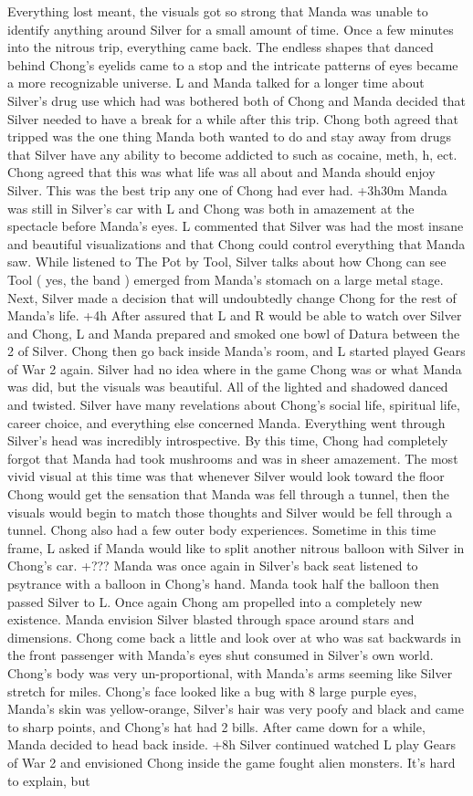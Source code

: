 \documentclass[12pt]{book}
\begin{document}
Everything lost meant, the visuals got so strong that Manda was unable to identify anything around Silver for a small amount of time. Once a few minutes into the nitrous trip, everything came back. The endless shapes that danced behind Chong's eyelids came to a stop and the intricate patterns of eyes became a more recognizable universe. L and Manda talked for a longer time about Silver's drug use which had was bothered both of Chong and Manda decided that Silver needed to have a break for a while after this trip. Chong both agreed that tripped was the one thing Manda both wanted to do and stay away from drugs that Silver have any ability to become addicted to such as cocaine, meth, h, ect. Chong agreed that this was what life was all about and Manda should enjoy Silver. This was the best trip any one of Chong had ever had. +3h30m Manda was still in Silver's car with L and Chong was both in amazement at the spectacle before Manda's eyes. L commented that Silver was had the most insane and beautiful visualizations and that Chong could control everything that Manda saw. While listened to The Pot by Tool, Silver talks about how Chong can see Tool ( yes, the band ) emerged from Manda's stomach on a large metal stage. Next, Silver made a decision that will undoubtedly change Chong for the rest of Manda's life. +4h After assured that L and R would be able to watch over Silver and Chong, L and Manda prepared and smoked one bowl of Datura between the 2 of Silver. Chong then go back inside Manda's room, and L started played Gears of War 2 again. Silver had no idea where in the game Chong was or what Manda was did, but the visuals was beautiful. All of the lighted and shadowed danced and twisted. Silver have many revelations about Chong's social life, spiritual life, career choice, and everything else concerned Manda. Everything went through Silver's head was incredibly introspective. By this time, Chong had completely forgot that Manda had took mushrooms and was in sheer amazement. The most vivid visual at this time was that whenever Silver would look toward the floor Chong would get the sensation that Manda was fell through a tunnel, then the visuals would begin to match those thoughts and Silver would be fell through a tunnel. Chong also had a few outer body experiences. Sometime in this time frame, L asked if Manda would like to split another nitrous balloon with Silver in Chong's car. +??? Manda was once again in Silver's back seat listened to psytrance with a balloon in Chong's hand. Manda took half the balloon then passed Silver to L. Once again Chong am propelled into a completely new existence. Manda envision Silver blasted through space around stars and dimensions. Chong come back a little and look over at who was sat backwards in the front passenger with Manda's eyes shut consumed in Silver's own world. Chong's body was very un-proportional, with Manda's arms seeming like Silver stretch for miles. Chong's face looked like a bug with 8 large purple eyes, Manda's skin was yellow-orange, Silver's hair was very poofy and black and came to sharp points, and Chong's hat had 2 bills. After came down for a while, Manda decided to head back inside. +8h Silver continued watched L play Gears of War 2 and envisioned Chong inside the game fought alien monsters. It's hard to explain, but 
\end{document}

